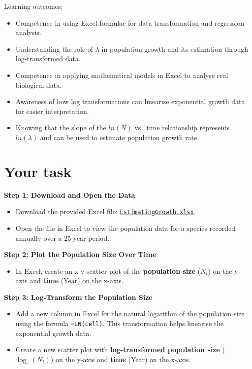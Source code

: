 \documentclass[
  a4paper]{book}
\providecommand{\tightlist}{%
  \setlength{\itemsep}{0pt}\setlength{\parskip}{0pt}}
\begin{document}
\begin{do-something}
Learning outcomes:

\begin{itemize}
\tightlist
\item
  Competence in using Excel formulae for data transformation and
  regression analysis.
\item
  Understanding the role of \(\lambda\) in population growth and its
  estimation through log-transformed data.
\item
  Competence in applying mathematical models in Excel to analyse real
  biological data.
\item
  Awareness of how log transformations can linearise exponential growth
  data for easier interpretation.
\item
  Knowing that the slope of the \(ln(N)\) vs.~time relationship
  represents \(ln(\lambda)\) and can be used to estimate population
  growth rate.
\end{itemize}
\end{do-something}

\section{Your task}\label{your-task-3}

\textbf{Step 1: Download and Open the Data}

\begin{itemize}
\tightlist
\item
  Download the provided Excel file: \href{https://www.dropbox.com/scl/fi/k9z32wndllofihsyhj728/EstimatingGrowth.xlsx?rlkey=7gukyzvdm4pv1wsbnljfymvx1&dl=1}{\texttt{EstimatingGrowth.xlsx}}.
\item
  Open the file in Excel to view the population data for a species recorded annually over a 25-year period.
\end{itemize}

\textbf{Step 2: Plot the Population Size Over Time}

\begin{itemize}
\tightlist
\item
  In Excel, create an x-y scatter plot of the \textbf{population size} (\(N_t\)) on the y-axis and \textbf{time} (Year) on the x-axis.
\end{itemize}

\textbf{Step 3: Log-Transform the Population Size}

\begin{itemize}
\tightlist
\item
  Add a new column in Excel for the natural logarithm of the population size using the formula \texttt{=LN(cell)}. This transformation helps linearise the exponential growth data.
\item
  Create a new scatter plot with \textbf{log-transformed population size} (\(\log_e(N_t)\)) on the y-axis and \textbf{time} (Year) on the x-axis.
\end{itemize}
\end{document}
